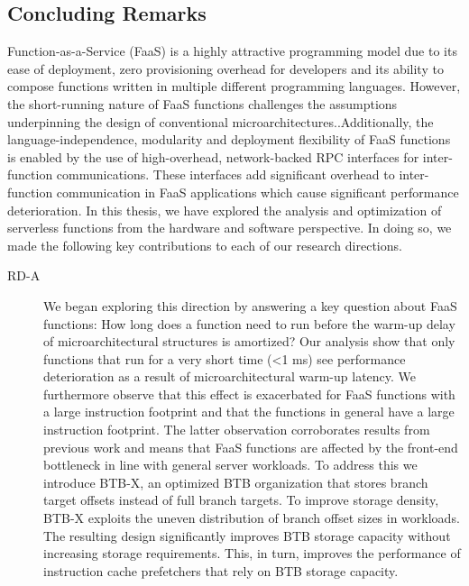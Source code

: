 \documentclass[../main.tex]{subfiles}
\begin{document}
\ifx\chapincluded\undefined
  \begin{refsection}
 \fi

\chapter{Concluding Remarks}
\label{chap:conclusions}
Function-as-a-Service (FaaS) is a highly attractive programming model
due to its ease of deployment, zero provisioning overhead for
developers and its ability to compose functions written in multiple
different programming languages. However, the short-running nature of
FaaS functions challenges the assumptions underpinning the design of
conventional microarchitectures..Additionally, the
language-independence, modularity and deployment flexibility of FaaS
functions is enabled by the use of high-overhead, network-backed RPC
interfaces for inter-function communications. These interfaces add
significant overhead to inter-function communication in FaaS
applications which cause significant performance deterioration. In
this thesis, we have explored the analysis and optimization of
serverless functions from the hardware and software perspective. In
doing so, we made the following key contributions to each of our
research directions.

\begin{description}

\item[RD-A] We began exploring this direction by answering a key question about FaaS functions: How long does a function need to run before the warm-up delay of microarchitectural structures is amortized? Our analysis show that only functions that run for a very short time (<1 ms) see performance deterioration as a result of microarchitectural warm-up latency. We furthermore observe that this effect is exacerbated for FaaS functions with a large instruction footprint and that the functions in general have a large instruction footprint. The latter observation corroborates results from previous work and means that FaaS functions are affected by the front-end bottleneck in line with general server workloads. To address this we introduce BTB-X, an optimized BTB organization that stores branch target offsets instead of full branch targets. To improve storage density, BTB-X exploits the uneven distribution of branch offset sizes in workloads. The resulting design significantly improves BTB storage capacity without increasing storage requirements. This, in turn, improves the performance of instruction cache prefetchers that rely on BTB storage capacity.


\end{description}
\end{refsection}
\end{document}
